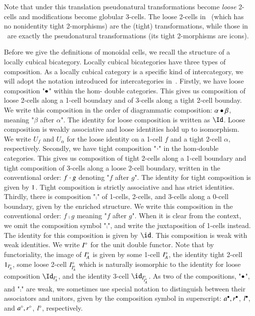 Note that under this translation pseudonatural transformations become \emph{loose} 2-cells and modifications become globular 3-cells.
The loose 2-cells in \cDblf\ (which has no nonidentity tight 2-morphisms) are the (tight) transformations, while those in \fBicat\ are exactly the pseudonatural transformations (its tight 2-morphisms are icons).

Before we give the definitions of monoidal cells, we recall the structure of a locally cubical bicategory. Locally cubical bicategories have three types of composition. As a locally cubical category is a specific kind of intercategory, we will adopt the notation introduced for intercategories in~\cite{gp:intercategories-i}. Firstly, we have loose composition "$\bullet$" within the hom- double categories. This gives us composition of loose 2-cells along a 1-cell boundary and of 3-cells along a tight 2-cell bounday. We write this composition in the order of diagrammatic composition: $\alpha \bullet \beta$, meaning "$\beta$ after $\alpha$". The identity for loose composition is written as $\looseid$. Loose composition is weakly associative and loose identities hold up to isomorphism. We write $U_{f}$ and $U_{\alpha}$ for the loose identity on a 1-cell $f$ and a tight 2-cell $\alpha$, respectively. 
Secondly, we have tight composition "$\cdot$" in the hom-double categories. This gives us composition of tight 2-cells along a 1-cell boundary and tight composition of 3-cells along a loose 2-cell boundary, written in the conventional order: $f \cdot g$ denoting "$f$ after $g$". The identity for tight composition is given by $1$. Tight composition is strictly associative and has strict identities.
Thirdly, there is composition "$\comp$" of 1-cells, 2-cells, and 3-cells along a 0-cell boundary, given by the enriched structure. We write this composition in the conventional order: $f \comp g$ meaning "$f$ after $g$". When it is clear from the context, we omit the composition symbol "$\comp$",  and write the juxtaposition of 1-cells instead. The identity for this composition is given by $\transid$. This composition is weak with weak identities. We write $I^{\circ}$ for the unit double functor. Note that by functoriality, the image of $I^{\circ}_A$ is given by some 1-cell $I^{\circ}_A$, the identity tight 2-cell $1_{I^{\circ}_A}$, some loose 2-cell $I^{\circ}_{I^{\circ}_A}$ which is naturally isomorphic to the identity for loose composition $\looseid_{\compI_A}$, and the identity 3-cell  $\id_{\compI_{\compI_A}}$.
As two of the compositions, "$\bullet$", and "$\comp$" are weak, we sometimes use special notation to distinguish between their associators and unitors, given by the composition symbol in superscript: $a^{\bullet}, r^{\bullet}$, $l^{\bullet}$, and $a^{\circ}, r^{\circ}$, $l^{\circ}$, respectively.

